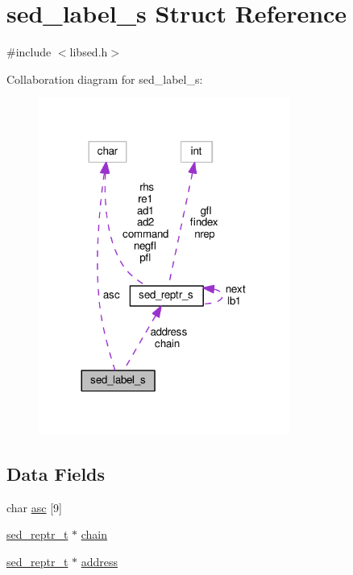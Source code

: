 \hypertarget{structsed__label__s}{}\section{sed\+\_\+label\+\_\+s Struct Reference}
\label{structsed__label__s}


{\ttfamily \#include $<$libsed.\+h$>$}



Collaboration diagram for sed\+\_\+label\+\_\+s\+:
\nopagebreak
\begin{figure}[H]
\begin{center}
\leavevmode
\includegraphics[width=233pt]{structsed__label__s__coll__graph}
\end{center}
\end{figure}
\subsection*{Data Fields}
\begin{DoxyCompactItemize}
\item 
char \hyperlink{structsed__label__s_aa0fd72965198b903e2d031ad0dd80d74}{asc} \mbox{[}9\mbox{]}
\item 
\hyperlink{libsed_8h_a732387e56354bf438c15e5c9cd085237}{sed\+\_\+reptr\+\_\+t} $\ast$ \hyperlink{structsed__label__s_ae53a1b390beded7818fa3c09162bb0b2}{chain}
\item 
\hyperlink{libsed_8h_a732387e56354bf438c15e5c9cd085237}{sed\+\_\+reptr\+\_\+t} $\ast$ \hyperlink{structsed__label__s_a6f5e48328b58d2cc3ae68c5ac7430f39}{address}
\end{DoxyCompactItemize}


